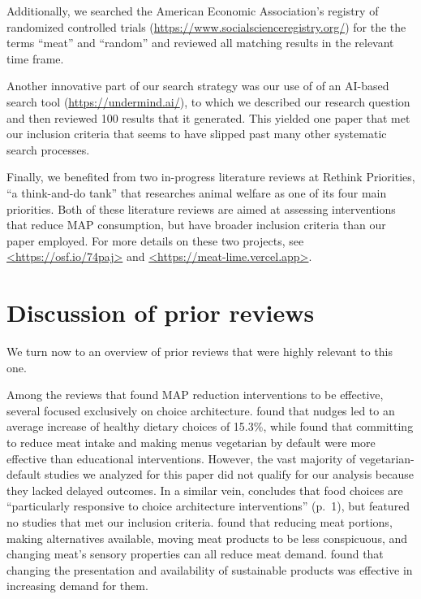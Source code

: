 \documentclass[preprint, 3p,
authoryear]{elsarticle} %
\begin{document}
Additionally, we searched the American Economic Association's registry
of randomized controlled trials
(\url{https://www.socialscienceregistry.org/}) for the the terms
``meat'' and ``random'' and reviewed all matching results in the
relevant time frame.

Another innovative part of our search strategy was our use of of an
AI-based search tool (\url{https://undermind.ai/}), to which we
described our research question and then reviewed 100 results that it
generated. This yielded one paper that met our inclusion criteria
\citep{mattson2020} that seems to have slipped past many other
systematic search processes.

Finally, we benefited from two in-progress literature reviews at Rethink
Priorities, ``a think-and-do tank'' that researches animal welfare as
one of its four main priorities. Both of these literature reviews are
aimed at assessing interventions that reduce MAP consumption, but have
broader inclusion criteria than our paper employed. For more details on
these two projects, see \url{<https://osf.io/74paj>} and
\url{<https://meat-lime.vercel.app>}.

\section{Discussion of prior reviews}\label{discussion-of-prior-reviews}

We turn now to an overview of prior reviews that were highly relevant to
this one.

Among the reviews that found MAP reduction interventions to be
effective, several focused exclusively on choice architecture.
\citep{arno2016} found that nudges led to an average increase of healthy
dietary choices of 15.3\%, while \citep{byerly2018} found that
committing to reduce meat intake and making menus vegetarian by default
were more effective than educational interventions. However, the vast
majority of vegetarian-default studies we analyzed for this paper did
not qualify for our analysis because they lacked delayed outcomes. In a
similar vein, \citep{mertens2022} concludes that food choices are
``particularly responsive to choice architecture interventions'' (p.~1),
but featured no studies that met our inclusion criteria.
\citep{bianchi2018restructuring} found that reducing meat portions,
making alternatives available, moving meat products to be less
conspicuous, and changing meat's sensory properties can all reduce meat
demand. \citep{pandey2023} found that changing the presentation and
availability of sustainable products was effective in increasing demand
for them.
\end{document}
